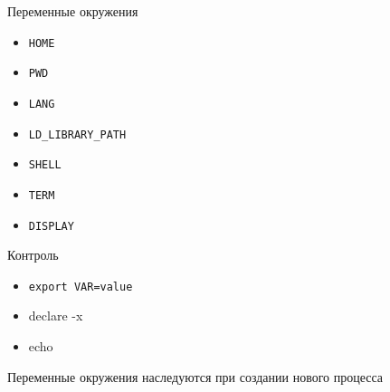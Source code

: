 \begin{frame}{Переменные окружения}
  \begin{itemize}
    \item {\tt HOME}
    \item {\tt PWD}
    \item {\tt LANG}
    \item {\tt LD\_LIBRARY\_PATH}
    \item {\tt SHELL}
    \item {\tt TERM}
    \item {\tt DISPLAY}
  \end{itemize}

  Контроль

  \begin{itemize}
    \item {\tt export VAR=value}
    \item declare -x
    \item echo 
  \end{itemize}

  Переменные окружения наследуются при создании нового процесса
\end{frame}

%
%



